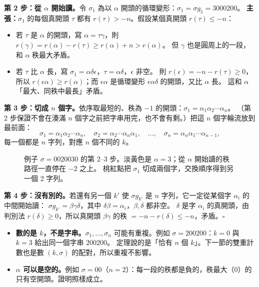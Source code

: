 \textbf{第 2 步：從 $\alpha$ 開始讀。}令 $\sigma_1$ 為以 $\alpha$ 開頭的循環變形：$\sigma_1=\sigma g_5=3000200$。
\textbf{主張：}$\sigma_1$ 的每個真開頭 $\tau$ 都有 $r(\tau)>-n$。假設某個真開頭 $r(\tau)\le-n$：
\begin{itemize}
  \item 若 $\tau$ 是 $\alpha$ 的開頭，寫 $\alpha=\tau\gamma$，則 $r(\gamma)=r(\alpha)-r(\tau)\ge r(\alpha)+n>r(\alpha)$。
        但 $\gamma$ 也是圓周上的一段，和 $\alpha$ 秩最大矛盾。
  \item 若 $\tau$ 比 $\alpha$ 長，寫 $\sigma_1=\alpha\delta\epsilon$，$\tau=\alpha\delta$，$\epsilon$ 非空。
        則 $r(\epsilon)=-n-r(\tau)\ge0$，所以 $r(\epsilon\alpha)\ge r(\alpha)$；而 $\epsilon\alpha$ 是循環變形 $\epsilon\alpha\delta$ 的開頭，又比 $\alpha$ 長。
        這和 $\alpha$「最大、同秩中最長」矛盾。
\end{itemize}

\textbf{第 3 步：切成 $n$ 個字。}依序取最短的、秩為 $-1$ 的開頭：$\sigma_1=\alpha_1\alpha_2\cdots\alpha_n$。
（第 2 步保證不會在湊滿 $n$ 個字之前把字串用完，也不會有剩。）把這 $n$ 個字輪流放到最前面：
\[
\sigma_1=\alpha_1\alpha_2\cdots\alpha_n,\quad \sigma_2=\alpha_2\cdots\alpha_n\alpha_1,\quad\ldots,\quad \sigma_n=\alpha_n\alpha_1\cdots\alpha_{n-1},
\]
每一個都是 $n$ 字列，對應 $n$ 個不同的 $k$。

\begin{figure}[H]
\centering
\RanAlpha
\caption{例子 $\sigma=0020030$ 的第 2--3 步。淡黃色是 $\alpha=3$；從 $\alpha$ 開始讀的秩路徑一直停在 $-2$ 之上。
桃紅點把 $\sigma_1$ 切成兩個字，交換順序得到另一個 2 字列。}
\label{fig:alpha}
\end{figure}

\textbf{第 4 步：沒有別的。}若還有另一個 $k'$ 使 $\sigma g_{k'}$ 是 $n$ 字列，它一定從某個字 $\alpha_i$ 的中間開始讀：
$\sigma g_{k'}=\beta\gamma\delta$，其中 $\delta\beta=\alpha_i$，$\beta,\delta$ 都非空。
$\delta$ 是字 $\alpha_i$ 的真開頭，由判別法 $r(\delta)\ge0$，所以真開頭 $\beta\gamma$ 的秩 $=-n-r(\delta)\le-n$，矛盾。\hfill$\square$

\begin{notebox}[兩個細節]
\begin{itemize}[leftmargin=1.4em]
  \item \textbf{數的是 $k$，不是字串。}$\sigma_1,\ldots,\sigma_n$ 可能有重複。例如 $\sigma=200200$：$k=0$ 與 $k=3$ 給出同一個字串 $200200$。
        定理說的是「恰有 $n$ 個 $k$」。下一節的雙重計數也是數 $(k,\sigma)$ 的配對，所以重複不影響。
  \item \textbf{$\alpha$ 可以是空的。}例如 $\sigma=00$（$n=2$）：每一段的秩都是負的，秩最大（0）的只有空開頭。證明照樣成立。
\end{itemize}
\end{notebox}

